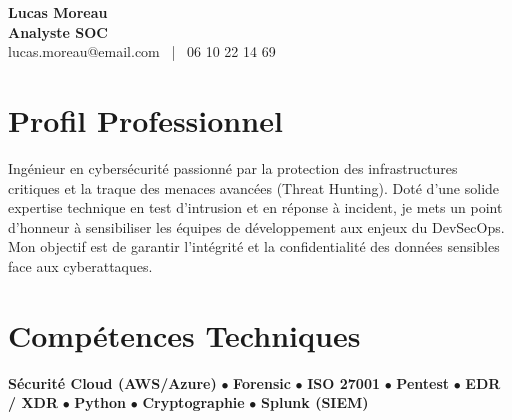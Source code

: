 \documentclass[11pt,a4paper]{article}
\begin{document}
\begin{center}
    {\Huge \textbf{Lucas Moreau}} \\[0.2cm]
    {\Large \textbf{Analyste SOC}} \\[0.1cm]
    lucas.moreau@email.com \ | \ 06 10 22 14 69
\end{center}

\vspace{0.3cm}

\section*{Profil Professionnel}
\noindent
Ingénieur en cybersécurité passionné par la protection des infrastructures critiques et la traque des menaces avancées (Threat Hunting). Doté d'une solide expertise technique en test d'intrusion et en réponse à incident, je mets un point d'honneur à sensibiliser les équipes de développement aux enjeux du DevSecOps. Mon objectif est de garantir l'intégrité et la confidentialité des données sensibles face aux cyberattaques.

\vspace{0.3cm}

\section*{Compétences Techniques}
\noindent
\textbf{Sécurité Cloud (AWS/Azure)} $\bullet$ \textbf{Forensic} $\bullet$ \textbf{ISO 27001} $\bullet$ \textbf{Pentest} $\bullet$ \textbf{EDR / XDR} $\bullet$ \textbf{Python} $\bullet$ \textbf{Cryptographie} $\bullet$ \textbf{Splunk (SIEM)}

\vspace{0.3cm}

\end{document}
